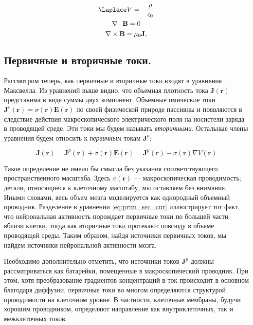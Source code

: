 \begin{gather}
    \Laplace V = -\frac{\rho}{\epsilon_0} \label{eq:max_quasi1} \\
    \nabla \cdot \mathbf{B} = 0 \label{eq:max_quasi2} \\
    \nabla \times \mathbf{B} = \mu_0 \mathbf{J} \label{eq:max_quasi3},
\end{gather}

\subsection{Первичные и вторичные токи.}
Рассмотрим теперь, как первичные и вторичные токи входят в уравнения Максвелла.
Из уравнений выше видно, что объемная плотность тока $\mathbf{J}(\mathbf{r})$
представима в виде суммы двух компонент. Объемные омические токи
$\mathbf{J}^v(\mathbf{r}) = \sigma(\mathbf{r}) \mathbf{E}(\mathbf{r})$ по своей
физической природе пассивны и появляются в следствие действия макроскопического
электрического поля на носистели заряда в проводящей среде.  Эти токи мы будем
называть \emph{вторичными}.  Остальные члены уравнения будем относить к
\emph{первичным} токам $\mathbf{J}^p$:

\begin{equation}
    \mathbf{J}(\mathbf{r}) =
    \mathbf{J}^p(\mathbf{r}) + \sigma(\mathbf{r}) \mathbf{E}(\mathbf{r}) =
    \mathbf{J}^p(\mathbf{r}) - \sigma(\mathbf{r}) \nabla V(\mathbf{r})
    \label{eq:prim_sec_cur}
\end{equation}

Такое определение не имело бы смысла без указания соответствующего
пространственного масштаба.  Здесь $\sigma(\mathbf{r})$ --- макроскопическая
проводимость; детали, относящиеся к клеточному масштабу, мы оставляем без
внимания. Иными словами, весь объем мозга моделируется как однородный объемный
проводник.  Разделение в уравнении \ref{eq:prim_sec_cur} иллюстрирует тот факт,
что нейрональная активность порождает первичные токи по большей части вблизи
клетки, тогда как вторичные токи протекают повсюду в объеме проводящей среды.
Таким образом, найдя источники первичных токов, мы найдем источники
нейрональной активности мозга.

Необходимо дополнительно отметить, что источники токов $\mathbf{J}^p$ должны
рассматриваться как батарейки, помещенные в макроскопический проводник. При
этом, хотя преобразование градиентов концентраций в ток происходит в основном
благодаря диффузии, первичные токи во многом определяются структурой
проводимости на клеточном уровне. В частности, клеточные мембраны, будучи
хорошим проводником, определяют направление как внутриклеточных, так и
межклеточных токов.

